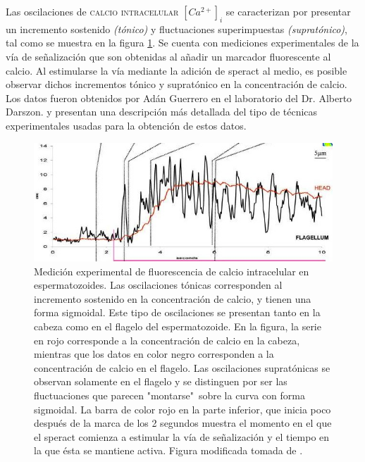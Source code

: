 Las oscilaciones de \textsc{calcio intracelular} $[Ca^{2+}]_i$ se caracterizan por presentar un incremento sostenido \emph{(tónico)} y fluctuaciones superimpuestas \emph{(supratónico)}, tal como se muestra en la figura \ref{fig:fluorescencia}. Se cuenta con mediciones experimentales de la vía de señalización que son obtenidas al añadir un marcador fluorescente al calcio. Al estimularse la vía mediante la adición de speract al medio, es posible observar dichos incrementos tónico y supratónico en la concentración de calcio. Los datos fueron obtenidos por Adán Guerrero en el laboratorio del Dr. Alberto Darszon. \citeauthor{Darszon2008} \citep{Darszon2008} y \citeauthor{Wood2007} \citep{Wood2007} presentan una descripción más detallada del tipo de técnicas experimentales usadas para la obtención de estos datos.
\\

\begin{figure}[hbt]
\includegraphics[width=0.9\linewidth]{gfx/maderaSperact}
\caption[Medición experimental de calcio intracelular]{Medición experimental de fluorescencia de calcio intracelular en espermatozoides. Las oscilaciones tónicas corresponden al incremento sostenido en la concentración de calcio, y tienen una forma sigmoidal. Este tipo de oscilaciones se presentan tanto en la cabeza como en el flagelo del espermatozoide. En la figura, la serie en rojo corresponde a la concentración de calcio en la cabeza, mientras que los datos en color negro corresponden a la concentración de calcio en el flagelo. Las oscilaciones supratónicas se observan solamente en el flagelo y se distinguen por ser las fluctuaciones que parecen "montarse"\ sobre la curva con forma sigmoidal. La barra de color rojo en la parte inferior, que inicia poco después de la marca de los 2 segundos muestra el momento en el que el speract comienza a estimular la vía de señalización y el tiempo en la que ésta se mantiene activa. Figura modificada tomada de \citeauthor{Wood2003} \citep{Wood2003}.}\label{fig:fluorescencia}
\end{figure}


